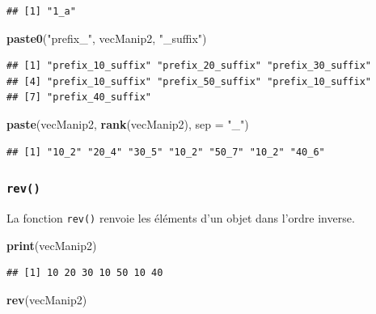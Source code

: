\documentclass[]{book}
\newenvironment{Shaded}{\begin{snugshade}}{\end{snugshade}}
\newcommand{\DataTypeTok}[1]{\textcolor[rgb]{0.13,0.29,0.53}{#1}}
\newcommand{\KeywordTok}[1]{\textcolor[rgb]{0.13,0.29,0.53}{\textbf{#1}}}
\newcommand{\NormalTok}[1]{#1}
\newcommand{\StringTok}[1]{\textcolor[rgb]{0.31,0.60,0.02}{#1}}
\begin{document}
\begin{verbatim}
## [1] "1_a"
\end{verbatim}

\begin{Shaded}
\begin{Highlighting}[]
\KeywordTok{paste0}\NormalTok{(}\StringTok{"prefix_"}\NormalTok{, vecManip2, }\StringTok{"_suffix"}\NormalTok{)}
\end{Highlighting}
\end{Shaded}

\begin{verbatim}
## [1] "prefix_10_suffix" "prefix_20_suffix" "prefix_30_suffix"
## [4] "prefix_10_suffix" "prefix_50_suffix" "prefix_10_suffix"
## [7] "prefix_40_suffix"
\end{verbatim}

\begin{Shaded}
\begin{Highlighting}[]
\KeywordTok{paste}\NormalTok{(vecManip2, }\KeywordTok{rank}\NormalTok{(vecManip2), }\DataTypeTok{sep =} \StringTok{"_"}\NormalTok{)}
\end{Highlighting}
\end{Shaded}

\begin{verbatim}
## [1] "10_2" "20_4" "30_5" "10_2" "50_7" "10_2" "40_6"
\end{verbatim}

\hypertarget{l015rev}{%
\subsubsection{\texorpdfstring{\texttt{rev()}}{rev()}}\label{l015rev}}

La fonction \texttt{rev()} renvoie les éléments d'un objet dans l'ordre inverse.

\begin{Shaded}
\begin{Highlighting}[]
\KeywordTok{print}\NormalTok{(vecManip2)}
\end{Highlighting}
\end{Shaded}

\begin{verbatim}
## [1] 10 20 30 10 50 10 40
\end{verbatim}

\begin{Shaded}
\begin{Highlighting}[]
\KeywordTok{rev}\NormalTok{(vecManip2)}
\end{Highlighting}
\end{Shaded}
\end{document}
